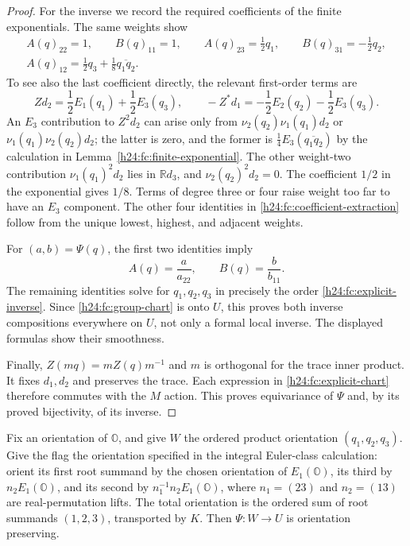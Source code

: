 \begin{proof}
For the inverse we record the required coefficients of the finite
exponentials. The same weights show
\begin{equation}
 \begin{gathered}
 A(q)_{22}=1,\qquad B(q)_{11}=1,\qquad
 A(q)_{23}=\frac12q_1,\qquad
 B(q)_{31}=-\frac12q_2,\\
 A(q)_{12}=\frac12q_3+\frac18\overline{q_1q_2}.
 \label{h24:fc:coefficient-extraction}
 \end{gathered}
\end{equation}
To see also the last coefficient directly, the relevant first-order
terms are
\[
 Zd_2=\frac12E_1(q_1)+\frac12E_3(q_3),\qquad
 -Z^*d_1=-\frac12E_2(q_2)-\frac12E_3(q_3).
\]
An $E_3$ contribution to $Z^2d_2$ can arise only from
$\nu_2(q_2)\nu_1(q_1)d_2$ or
$\nu_1(q_1)\nu_2(q_2)d_2$; the latter is zero, and the former
is $\frac14E_3(\overline{q_1q_2})$ by the calculation in
Lemma~\ref{h24:fc:finite-exponential}. The other weight-two
contribution $\nu_1(q_1)^2d_2$ lies in $\mathbb R d_3$,
and $\nu_2(q_2)^2d_2=0$. The coefficient $1/2$ in the
exponential gives $1/8$. Terms of degree three or four raise
weight too far to have an $E_3$ component. The other four
identities in \eqref{h24:fc:coefficient-extraction} follow from
the unique lowest, highest, and adjacent weights.

For $(a,b)=\Psi(q)$, the first two identities imply
\[
 A(q)=\frac{a}{a_{22}},\qquad
 B(q)=\frac{b}{b_{11}}.
\]
The remaining identities solve for $q_1,q_2,q_3$ in precisely
the order \eqref{h24:fc:explicit-inverse}. Since
\eqref{h24:fc:group-chart} is onto $U$, this proves both inverse
compositions everywhere on $U$, not only a formal local inverse.
The displayed formulas show their smoothness.

Finally, $Z(mq)=mZ(q)m^{-1}$ and $m$ is orthogonal for the
trace inner product. It fixes $d_1,d_2$ and preserves the trace.
Each expression in \eqref{h24:fc:explicit-chart} therefore
commutes with the $M$ action. This proves equivariance of $\Psi$
and, by its proved bijectivity, of its inverse.
\end{proof}

\begin{proposition}
\label{h24:fc:orientation}
Fix an orientation of $\mathbb O$, and give $W$ the ordered product
orientation $(q_1,q_2,q_3)$. Give the flag the orientation specified
in the integral Euler-class calculation: orient its first root
summand by the chosen orientation of $E_1(\mathbb O)$, its third
by $n_2E_1(\mathbb O)$, and its second by
$n_1^{-1}n_2E_1(\mathbb O)$, where $n_1=(23)$ and $n_2=(13)$
are real-permutation lifts. The total orientation is the ordered
sum of root summands $(1,2,3)$, transported by $K$.
Then $\Psi:W\to U$ is orientation preserving.
\end{proposition}

